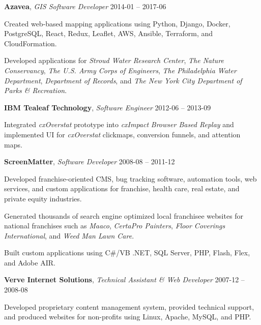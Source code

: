 \documentclass[12pt,a4paper]{article}
\newcommand{\workhead}[3]{\textbf{#1}, \emph{#2} \hfill #3}
\newcommand{\li}{\item[--]}
\begin{document}
\begin{description}[leftmargin=0em]
    \item
        \workhead{Azavea}{GIS Software Developer}{2014-01 -- 2017-06}
        \begin{itemize*}
            \li Created web-based mapping applications using Python, Django, Docker, PostgreSQL, \mbox{React}, Redux, Leaflet, AWS, Ansible, Terraform, and CloudFormation.
            \li Developed applications for \emph{Stroud Water Research Center}, \emph{The Nature Conservancy}, \emph{The U.S. Army Corps of Engineers}, \emph{The Philadelphia Water Department}, \emph{Department of Records}, and \emph{The New York City Department of Parks \& Recreation}.
        \end{itemize*}

    \item
        \workhead{IBM Tealeaf Technology}{Software Engineer}{2012-06 -- 2013-09}
        \begin{itemize*}
            \li Integrated \emph{cxOverstat} prototype into \emph{cxImpact} \emph{Browser Based Replay} and implemented UI for \emph{cxOverstat} clickmaps, conversion funnels, and attention maps.
        \end{itemize*}

    \item
        \workhead{ScreenMatter}{Software Developer}{2008-08 -- 2011-12}
        \begin{itemize*}
            \li Developed franchise-oriented CMS, bug tracking software, automation tools, web services, and custom applications for franchise, health care, real estate, and private equity industries.
            \li Generated thousands of search engine optimized local franchisee websites for national franchises such as \emph{Maaco}, \emph{\mbox{CertaPro} Painters}, \emph{Floor Coverings International}, and \emph{Weed Man Lawn Care}.
            \li Built custom applications using C\#/VB .NET, SQL Server, PHP, Flash, Flex, and Adobe AIR.
        \end{itemize*}

    \item
        \workhead{Verve Internet Solutions}{Technical Assistant \& Web Developer}{2007-12 -- 2008-08}
        \begin{itemize*}
            \li Developed proprietary content management system, provided technical support, and produced websites for non-profits using Linux, Apache, MySQL, and PHP.
        \end{itemize*}


\end{description}
\end{document}
